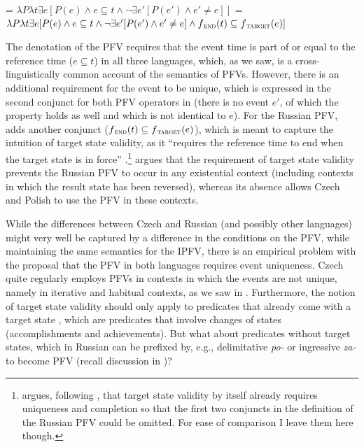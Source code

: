 \documentclass[output=paper,colorlinks,citecolor=brown]{langscibook}
\begin{document}
\ea\label{ex:muellerpfv}
\ea {} = $\lambda P \lambda t \exists e [P(e) \wedge e \subseteq t \wedge \neg \exists e' [P(e') \wedge e' \not = e]]$
\ex {} = $\lambda P \lambda t \exists e [P(e) \wedge e \subseteq t \wedge \neg \exists e' [P(e') \wedge e' \not = e] \wedge f\textsubscript{\textsc{end}}(t) \subseteq f\textsubscript{\textsc{target}}(e)]$
\z 
\z 

\noindent The denotation of the PFV requires that the event time is part of or equal to the reference time ($e \subseteq t$) in all three languages, which, as we saw, is a cross-linguistically common account of the semantics of PFVs. However, there is an additional requirement for the event to be unique, which is expressed in the second conjunct for both PFV operators in  (there is no event $e'$, of which the property holds as well and which is not identical to $e$). For the Russian PFV, \citeauthor{Mueller-Reichau2018a} adds another conjunct ($f\textsubscript{\textsc{end}}(t) \subseteq f\textsubscript{\textsc{target}}(e)$), which is meant to capture the intuition of target state validity, as it ``requires the reference time to end when the target state is in force'' \citep[][305]{Mueller-Reichau2018a}.\footnote{\citet{Mueller-Reichau2018a} argues, following \citet{mittwoch08}, that target state validity by itself already requires uniqueness and completion so that the first two conjuncts in the definition of the Russian PFV could be omitted. For ease of comparison I leave them here though.} \citeauthor{Mueller-Reichau2018a} argues that the requirement of target state validity prevents the Russian PFV to occur in any existential context (including contexts in which the result state has been reversed), whereas its absence allows Czech and Polish to use the PFV in these contexts. 

While the differences between Czech and Russian (and possibly other languages) might very well be captured by a difference in the conditions on the PFV, while maintaining the same semantics for the IPFV, there is an empirical problem with the proposal that the PFV in both languages requires event uniqueness. Czech quite regularly employs PFVs in contexts in which the events are not unique, namely in iterative and habitual contexts, as we saw in . Furthermore, the notion of target state validity should only apply to predicates that already come with a target state \citep[in the sense of, e.g.,][]{kratzer00}, which are predicates that involve changes of states (accomplishments and achievements). But what about predicates without target states, which in Russian can be prefixed by, e.g., delimitative \textit{po-} or ingressive \textit{za-} to become PFV (recall discussion in )? %
\end{document}
